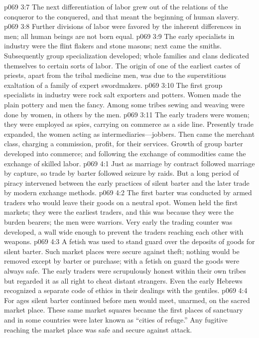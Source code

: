 \pc \vs p069 3:7 \bibnobreakspace {} The next differentiation of labor grew out of the relations of the conqueror to the conquered, and that meant the beginning of human slavery.
\pc \vs p069 3:8 \bibnobreakspace {} Further divisions of labor were favored by the inherent differences in men; all human beings are not born equal.
\vs p069 3:9 The early specialists in industry were the flint flakers and stone masons; next came the smiths. Subsequently group specialization developed; whole families and clans dedicated themselves to certain sorts of labor. The origin of one of the earliest castes of priests, apart from the tribal medicine men, was due to the superstitious exaltation of a family of expert swordmakers.
\pc \vs p069 3:10 The first group specialists in industry were rock salt exporters and potters. Women made the plain pottery and men the fancy. Among some tribes sewing and weaving were done by women, in others by the men.
\vs p069 3:11 The early traders were women; they were employed as spies, carrying on commerce as a side line. Presently trade expanded, the women acting as intermediaries---jobbers. Then came the merchant class, charging a commission, profit, for their services. Growth of group barter developed into commerce; and following the exchange of commodities came the exchange of skilled labor.
\vs p069 4:1 Just as marriage by contract followed marriage by capture, so trade by barter followed seizure by raids. But a long period of piracy intervened between the early practices of silent barter and the later trade by modern exchange methods.
\vs p069 4:2 The first barter was conducted by armed traders who would leave their goods on a neutral spot. Women held the first markets; they were the earliest traders, and this was because they were the burden bearers; the men were warriors. Very early the trading counter was developed, a wall wide enough to prevent the traders reaching each other with weapons.
\vs p069 4:3 A fetish was used to stand guard over the deposits of goods for silent barter. Such market places were secure against theft; nothing would be removed except by barter or purchase; with a fetish on guard the goods were always safe. The early traders were scrupulously honest within their own tribes but regarded it as all right to cheat distant strangers. Even the early Hebrews recognized a separate code of ethics in their dealings with the gentiles.
\vs p069 4:4 For ages silent barter continued before men would meet, unarmed, on the sacred market place. These same market squares became the first places of sanctuary and in some countries were later known as “cities of refuge.” Any fugitive reaching the market place was safe and secure against attack.
